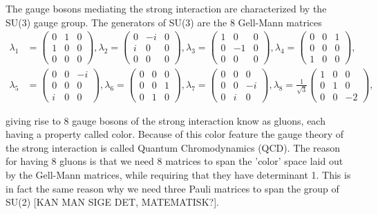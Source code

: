 The gauge bosons mediating the strong interaction are characterized by the SU(3) gauge group. The generators of SU(3) are the 8 Gell-Mann matrices
\begin{align} \label{eq:gellmannmatrices}
	\lambda_1 &= \begin{pmatrix} 0 & 1 & 0 \\ 1 & 0 & 0 \\ 0 & 0 & 0 \end{pmatrix},
	\lambda_2 = \begin{pmatrix} 0 & -i & 0 \\ i & 0 & 0 \\ 0 & 0 & 0 \end{pmatrix},
	\lambda_3 = \begin{pmatrix} 1 & 0 & 0 \\ 0 & -1 & 0 \\ 0 & 0 & 0 \end{pmatrix},
	\lambda_4 = \begin{pmatrix} 0 & 0 & 1 \\ 0 & 0 & 0 \\ 1 & 0 & 0 \end{pmatrix}, \nonumber \\
	\lambda_5 &= \begin{pmatrix} 0 & 0 & -i \\ 0 & 0 & 0 \\ i & 0 & 0 \end{pmatrix},
	\lambda_6 = \begin{pmatrix} 0 & 0 & 0 \\ 0 & 0 & 1 \\ 0 & 1 & 0 \end{pmatrix},
	\lambda_7 = \begin{pmatrix} 0 & 0 & 0 \\ 0 & 0 & -i \\ 0 & i & 0 \end{pmatrix},
	\lambda_8 = \frac{1}{\sqrt{3}} \begin{pmatrix} 1 & 0 & 0 \\ 0 & 1 & 0 \\ 0 & 0 & -2 \end{pmatrix},
\end{align}

giving rise to 8 gauge bosons of the strong interaction know as gluons, each having a property called color. Because of this color feature the gauge theory of the strong interaction is called Quantum Chromodynamics (QCD). The reason for having 8 gluons is that we need 8 matrices to span the 'color' space laid out by the Gell-Mann matrices, while requiring that they have determinant 1. This is in fact the same reason why we need three Pauli matrices to span the group of SU(2) [KAN MAN SIGE DET, MATEMATISK?].

